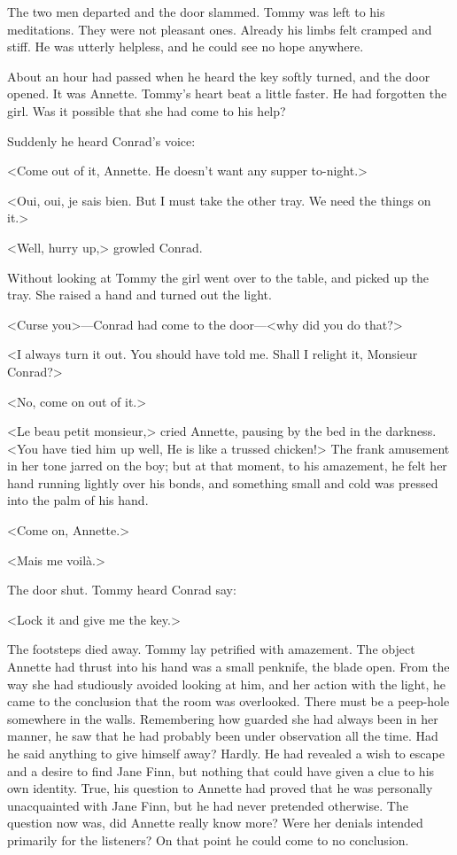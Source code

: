 The two men departed and the door slammed. Tommy was left to his meditations. They were not pleasant ones. Already his limbs felt cramped and stiff. He was utterly helpless, and he could see no hope anywhere.

About an hour had passed when he heard the key softly turned, and the door opened. It was Annette. Tommy's heart beat a little faster. He had forgotten the girl. Was it possible that she had come to his help?

Suddenly he heard Conrad's voice:

<Come out of it, Annette. He doesn't want any supper to-night.>

<Oui, oui, je sais bien. But I must take the other tray. We need the things on it.>

<Well, hurry up,> growled Conrad.

Without looking at Tommy the girl went over to the table, and picked up the tray. She raised a hand and turned out the light.

<Curse you>—Conrad had come to the door—<why did you do that?>

<I always turn it out. You should have told me. Shall I relight it, Monsieur Conrad?>

<No, come on out of it.>

<Le beau petit monsieur,> cried Annette, pausing by the bed in the darkness. <You have tied him up well,  He is like a trussed chicken!> The frank amusement in her tone jarred on the boy; but at that moment, to his amazement, he felt her hand running lightly over his bonds, and something small and cold was pressed into the palm of his hand.

<Come on, Annette.>

<Mais me voilà.>

The door shut. Tommy heard Conrad say:

<Lock it and give me the key.>

The footsteps died away. Tommy lay petrified with amazement. The object Annette had thrust into his hand was a small penknife, the blade open. From the way she had studiously avoided looking at him, and her action with the light, he came to the conclusion that the room was overlooked. There must be a peep-hole somewhere in the walls. Remembering how guarded she had always been in her manner, he saw that he had probably been under observation all the time. Had he said anything to give himself away? Hardly. He had revealed a wish to escape and a desire to find Jane Finn, but nothing that could have given a clue to his own identity. True, his question to Annette had proved that he was personally unacquainted with Jane Finn, but he had never pretended otherwise. The question now was, did Annette really know more? Were her denials intended primarily for the listeners? On that point he could come to no conclusion.

